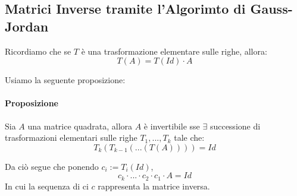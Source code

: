 \subsection{Matrici Inverse tramite l'Algorimto di Gauss-Jordan}
Ricordiamo che se $T$ è una trasformazione elementare sulle righe, allora:
\[ T(A) = T(Id) \cdot A \]

Usiamo la seguente proposizione:
\paragraph{Proposizione} Sia $A$ una matrice quadrata, allora $A$ è invertibile sse
$\exists$ successione di trasformazioni elementari sulle righe $T_1, ... , T_k$ tale che:
\[ T_k(T_{k-1}(...(T(A))))=Id\]

Da ciò segue che ponendo $c_i := T_i(Id)$,
\[ c_k \cdot ... \cdot c_2 \cdot c_1 \cdot A = Id \]
In cui la sequenza di ci $c$ rappresenta la matrice inversa.




